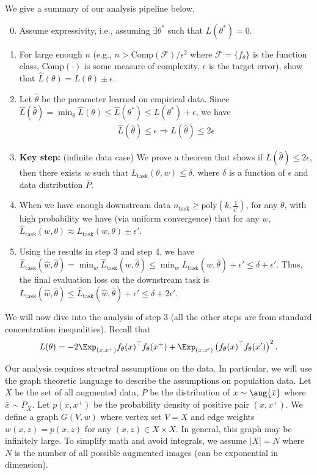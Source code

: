We give a summary of our analysis pipeline below. 
\begin{enumerate}\setcounter{enumi}{-1}
\item{Assume expressivity, i.e., assuming $\exists \theta^*$ such that $L(\theta^*)=0$.}
\item{For large enough $n$ (e.g., $n>\text{Comp}({\mathcal{F}})/\epsilon^2$ where ${\mathcal{F}}=\{f_\theta\}$ is the function class, $\text{Comp}(\cdot)$ is some measure of complexity, $\epsilon$ is the target error), show that $\hat{L}(\theta) = L(\theta) \pm \epsilon$.}
\item{Let $\hat{\theta}$ be the parameter learned on empirical data. Since $\hat{L}(\hat{\theta})=\min_{\theta}\hat{L}(\theta) \le \hat{L}(\theta^*) \le L(\theta^*)+\epsilon$, we have
\begin{align}
	\hat{L}(\hat{\theta})\le\epsilon \Rightarrow L(\hat{\theta}) \le 2\epsilon
\end{align}
}
\item{\textbf{Key step:} (infinite data case) We prove a theorem that shows if $L(\hat{\theta})\le2\epsilon$, then there exists $w$ such that $L_{\text{task}}(\theta, w)\le \delta$, where $\delta$ is a function of $\epsilon$ and data distribution $\bar{P}$.}
\item{When we have enough downstream data $n_{\text{task}}\ge\text{poly}(k, \frac{1}{\epsilon'})$, for any $\theta$, with high probability we have (via uniform convergence) that for any $w$, 
$	\hat{L}_{\text{task}}(w, \theta) \approx L_{\text{task}}(w, \theta)\pm \epsilon'$. }
\item{Using the results in step 3 and step 4, we have $\hat{L}_{\text{task}}(\hat{w}, \hat{\theta}) = \min_{w} \hat{L}_{\text{task}}(w, \hat{\theta}) \le \min_w L_{\text{task}}(w, \hat{\theta}) + \epsilon' \le \delta + \epsilon'$. Thus, the final evaluation loss on the downstream task is $L_{\text{task}}(\hat{w}, \hat{\theta}) \le \hat{L}_{\text{task}}(\hat{w}, \hat{\theta}) +\epsilon' \le \delta + 2\epsilon'$. }
\end{enumerate}

We will now dive into the analysis of step 3 (all the other steps are from standard concentration inequalities). Recall that 
\begin{align}
		L(\theta)  = -2\Exp_{(x, x^+) } f_{{\theta}}(x)^\top f_{{\theta}}(x^+) + \Exp_{(x, x') }  \left(f_{{\theta}}(x)^\top f_{{\theta}}(x')\right)^2.
\end{align}

Our analysis requires structral assumptions on the data. In particular, we will use the graph theoretic language to describe the assumptions on population data. Let $X$ be the set of all augmented data, $P$ be the distribution of $x\sim\aug{\bar{x}}$ where $\bar{x}\sim\bar{P}_{\bar{X}}$. Let $p(x, x^+)$ be the probability density of positive pair $(x, x^+)$. We define a graph $G(V, w)$ where vertex set $V=X$ and edge weights $w(x, z) = p(x, z)$ for any $(x, z) \in X\times X$. In general, this graph may be infinitely large. To simplify math and avoid integrals, we assume $|X|=N$ where $N$ is the number of all possible augmented images (can be exponential in dimension). 

